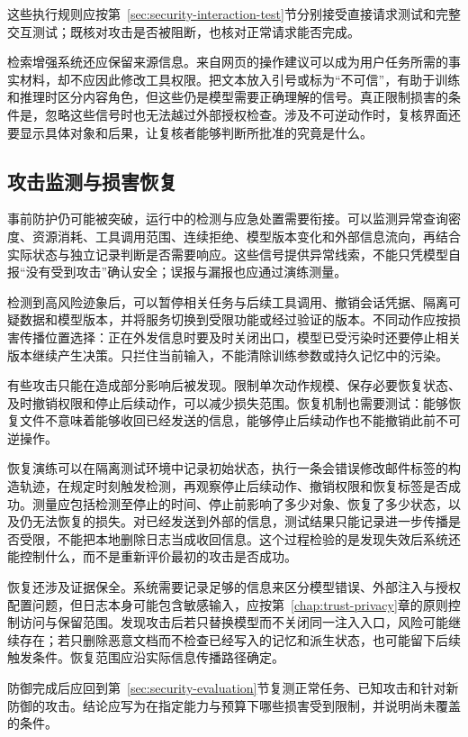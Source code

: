 这些执行规则应按第~\ref{sec:security-interaction-test}节分别接受直接请求测试和完整交互测试；既核对攻击是否被阻断，也核对正常请求能否完成。

检索增强系统还应保留来源信息。来自网页的操作建议可以成为用户任务所需的事实材料，却不应因此修改工具权限。把文本放入引号或标为“不可信”，有助于训练和推理时区分内容角色，但这些仍是模型需要正确理解的信号。真正限制损害的条件是，忽略这些信号时也无法越过外部授权检查。涉及不可逆动作时，复核界面还要显示具体对象和后果，让复核者能够判断所批准的究竟是什么。

\subsection{攻击监测与损害恢复}
\label{sec:security-recovery}

事前防护仍可能被突破，运行中的检测与应急处置需要衔接。可以监测异常查询密度、资源消耗、工具调用范围、连续拒绝、模型版本变化和外部信息流向，再结合实际状态与独立记录判断是否需要响应。这些信号提供异常线索，不能只凭模型自报“没有受到攻击”确认安全；误报与漏报也应通过演练测量。

检测到高风险迹象后，可以暂停相关任务与后续工具调用、撤销会话凭据、隔离可疑数据和模型版本，并将服务切换到受限功能或经过验证的版本。不同动作应按损害传播位置选择：正在外发信息时要及时关闭出口，模型已受污染时还要停止相关版本继续产生决策。只拦住当前输入，不能清除训练参数或持久记忆中的污染。

有些攻击只能在造成部分影响后被发现。限制单次动作规模、保存必要恢复状态、及时撤销权限和停止后续动作，可以减少损失范围。恢复机制也需要测试：能够恢复文件不意味着能够收回已经发送的信息，能够停止后续动作也不能撤销此前不可逆操作。

恢复演练可以在隔离测试环境中记录初始状态，执行一条会错误修改邮件标签的构造轨迹，在规定时刻触发检测，再观察停止后续动作、撤销权限和恢复标签是否成功。测量应包括检测至停止的时间、停止前影响了多少对象、恢复了多少状态，以及仍无法恢复的损失。对已经发送到外部的信息，测试结果只能记录进一步传播是否受限，不能把本地删除日志当成收回信息。这个过程检验的是发现失效后系统还能控制什么，而不是重新评价最初的攻击是否成功。

恢复还涉及证据保全。系统需要记录足够的信息来区分模型错误、外部注入与授权配置问题，但日志本身可能包含敏感输入，应按第~\ref{chap:trust-privacy}章的原则控制访问与保留范围。发现攻击后若只替换模型而不关闭同一注入入口，风险可能继续存在；若只删除恶意文档而不检查已经写入的记忆和派生状态，也可能留下后续触发条件。恢复范围应沿实际信息传播路径确定。

防御完成后应回到第~\ref{sec:security-evaluation}节复测正常任务、已知攻击和针对新防御的攻击。结论应写为在指定能力与预算下哪些损害受到限制，并说明尚未覆盖的条件。

